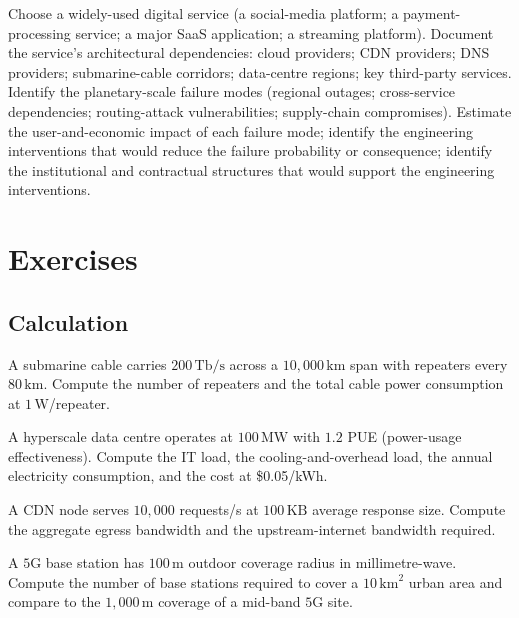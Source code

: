 \begin{project}
Choose a widely-used digital service (a social-media platform; a payment-processing service; a major SaaS application; a streaming platform). Document the service's architectural dependencies: cloud providers; CDN providers; DNS providers; submarine-cable corridors; data-centre regions; key third-party services. Identify the planetary-scale failure modes (regional outages; cross-service dependencies; routing-attack vulnerabilities; supply-chain compromises). Estimate the user-and-economic impact of each failure mode; identify the engineering interventions that would reduce the failure probability or consequence; identify the institutional and contractual structures that would support the engineering interventions.
\end{project}

\section{Exercises}

\subsection*{Calculation}

\begin{exercise}
A submarine cable carries $200\,\text{Tb/s}$ across a $10{,}000\,\text{km}$ span with repeaters every $80\,\text{km}$. Compute the number of repeaters and the total cable power consumption at $1\,\text{W}$/repeater.
\end{exercise}

\begin{exercise}
A hyperscale data centre operates at $100\,\text{MW}$ with $1.2$ PUE (power-usage effectiveness). Compute the IT load, the cooling-and-overhead load, the annual electricity consumption, and the cost at \$0.05/kWh.
\end{exercise}

\begin{exercise}
A CDN node serves $10{,}000$ requests/s at $100\,\text{KB}$ average response size. Compute the aggregate egress bandwidth and the upstream-internet bandwidth required.
\end{exercise}

\begin{exercise}
A $5$G base station has $100\,\text{m}$ outdoor coverage radius in millimetre-wave. Compute the number of base stations required to cover a $10\,\text{km}^2$ urban area and compare to the $1{,}000\,\text{m}$ coverage of a mid-band $5$G site.
\end{exercise}

